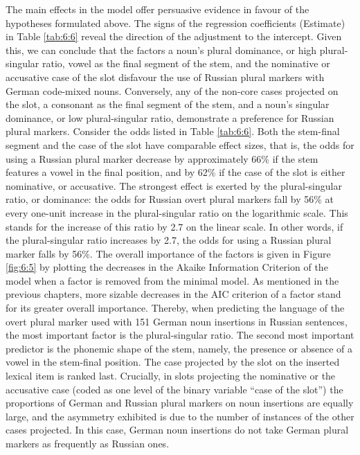 The main effects in the model offer persuasive evidence in favour of the hypotheses formulated above. The signs of the regression coefficients (Estimate) in Table \ref{tab:6:6} reveal the direction of the adjustment to the intercept. Given this, we can conclude that the factors a noun’s plural dominance, or high plural-singular ratio, vowel as the final segment of the stem, and the nominative or accusative case of the slot disfavour the use of Russian plural markers with German code-mixed nouns. Conversely, any of the non-core cases projected on the slot, a consonant as the final segment of the stem, and a noun's singular dominance, or low plural-singular ratio, demonstrate a preference for Russian plural markers. Consider the odds listed in Table \ref{tab:6:6}. Both the stem-final segment and the case of the slot have comparable effect sizes, that is, the odds for using a Russian plural marker decrease by approximately 66\% if the stem features a vowel in the final position, and by 62\% if the case of the slot is either nominative, or accusative. The strongest effect is exerted by the plural-singular ratio, or dominance: the odds for Russian overt plural markers fall by 56\% at every one-unit increase in the plural-singular ratio on the logarithmic scale. This stands for the increase of this ratio by 2.7 on the linear scale. In other words, if the plural-singular ratio increases by 2.7, the odds for using a Russian plural marker falls by 56\%. The overall importance of the factors is given in Figure \ref{fig:6:5} by plotting the decreases in the Akaike Information Criterion of the model when a factor is removed from the minimal model. As mentioned in the previous chapters, more sizable decreases in the AIC criterion of a factor stand for its greater overall importance. Thereby, when predicting the language of the overt plural marker used with 151 German noun insertions in Russian sentences, the most important factor is the plural-singular ratio. The second most important predictor is the phonemic shape of the stem, namely, the presence or absence of a vowel in the stem-final position. The case projected by the slot on the inserted lexical item is ranked last. Crucially, in slots projecting the nominative or the accusative case (coded as one level of the binary variable “case of the slot”) the proportions of German and Russian plural markers on noun insertions are equally large, and the asymmetry exhibited is due to the number of instances of the other cases projected. In this case, German noun insertions do not take German plural markers as frequently as Russian ones.

